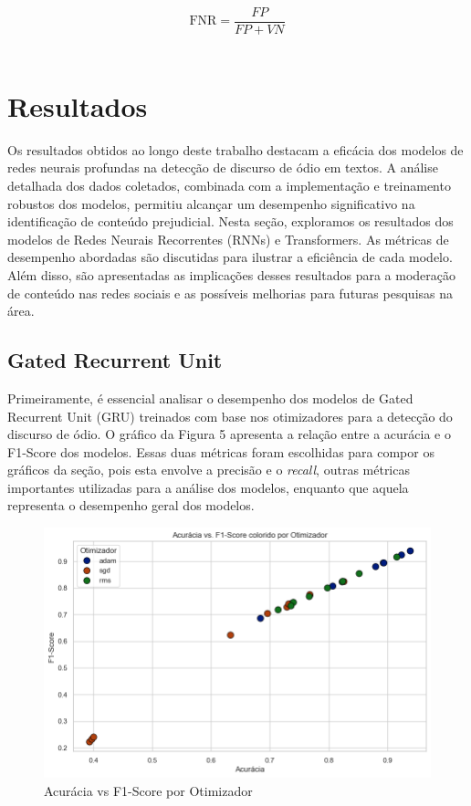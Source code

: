 \documentclass[conference]{IEEEtran}
\begin{document}
\begin{enumerate}
    \begin{equation}
    \text{FNR} = \frac{FP}{FP + VN}
    \end{equation} \\
    
\end{enumerate}

\section{Resultados}

Os resultados obtidos ao longo deste trabalho destacam a eficácia dos modelos de redes neurais profundas na detecção de discurso de ódio em textos. A análise detalhada dos dados coletados, combinada com a implementação e treinamento robustos dos modelos, permitiu alcançar um desempenho significativo na identificação de conteúdo prejudicial. Nesta seção, exploramos os resultados dos modelos de Redes Neurais Recorrentes (RNNs) e Transformers. As métricas de desempenho abordadas são discutidas para ilustrar a eficiência de cada modelo. Além disso, são apresentadas as implicações desses resultados para a moderação de conteúdo nas redes sociais e as possíveis melhorias para futuras pesquisas na área.

\subsection{Gated Recurrent Unit}

Primeiramente, é essencial analisar o desempenho dos modelos de Gated Recurrent Unit (GRU) treinados com base nos otimizadores para a detecção do discurso de ódio. O gráfico da Figura 5 apresenta a relação entre a acurácia e o F1-Score dos modelos. Essas duas métricas foram escolhidas para compor os gráficos da seção, pois esta envolve a precisão e o \textit{recall}, outras métricas importantes utilizadas para a análise dos modelos, enquanto que aquela representa o desempenho geral dos modelos.

\begin{figure}[h!]
    \centering
    \includegraphics[width=\linewidth]{gru-otimizador.png}
    \caption{Acurácia vs F1-Score por Otimizador}
    \label{fig:exemplo4}
\end{figure}
\end{document}
